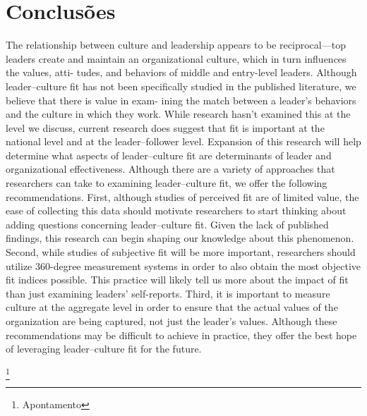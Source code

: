 \section{Conclusões}
The relationship between culture and leadership appears to be reciprocal—top leaders
create and maintain an organizational culture, which in turn influences the values, atti-
tudes, and behaviors of middle and entry-level leaders. Although leader–culture fit has not
been specifically studied in the published literature, we believe that there is value in exam-
ining the match between a leader’s behaviors and the culture in which they work. While
research hasn’t examined this at the level we discuss, current research does suggest that fit
is important at the national level and at the leader–follower level. Expansion of this
research will help determine what aspects of leader–culture fit are determinants of leader
and organizational effectiveness.
Although there are a variety of approaches that researchers can take to examining
leader–culture fit, we offer the following recommendations. First, although studies of
perceived fit are of limited value, the ease of collecting this data should motivate researchers
to start thinking about adding questions concerning leader–culture fit. Given the lack of
published findings, this research can begin shaping our knowledge about this phenomenon.
Second, while studies of subjective fit will be more important, researchers should utilize
360-degree measurement systems in order to also obtain the most objective fit indices
possible. This practice will likely tell us more about the impact of fit than just examining
leaders’ self-reports. Third, it is important to measure culture at the aggregate level in
order to ensure that the actual values of the organization are being captured, not just the
leader’s values. Although these recommendations may be difficult to achieve in practice,
they offer the best hope of leveraging leader–culture fit for the future.\\

\newpage
%
%
%
\listoffigures
\cite{*}

\newpage
\footnote{Apontamento}

